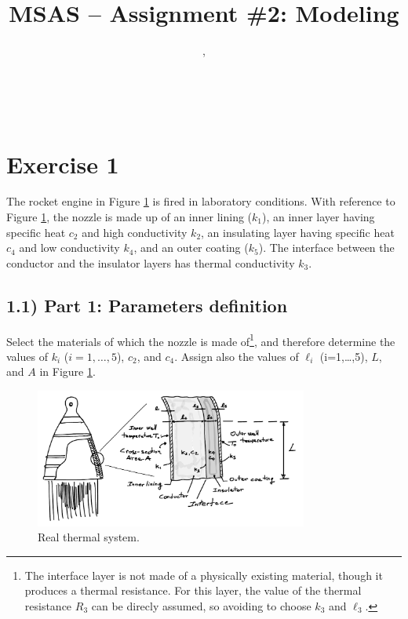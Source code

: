 \documentclass[11pt,a4paper,oneside]{article}
\title{MSAS -- Assignment \#2: Modeling} %
\author{\large \tr{Student Name}, \tr{123456}}
\date{}
\makeatletter
\newcommand\headlinecolor{\normalcolor}
\renewcommand*\maketitle{%
    \begingroup
    \centering
    \fontsize{15}{15}%
    \selectfont
    \headlinecolor
    \@title\\
    \vspace{5mm}
    \@author
    \par
    \vskip1in
    \endgroup
    \vspace{-22mm}
}
\makeatother
\begin{document}
\maketitle

\thispagestyle{fancy}


\section*{Exercise 1}
The rocket engine in Figure \ref{fig:therm} is fired in laboratory conditions. With reference to Figure \ref{fig:therm}, the nozzle is made up of an inner lining ($k_1$), an inner layer having specific heat $c_2$ and high conductivity $k_2$, an insulating layer having specific heat $c_4$ and low conductivity $k_4$, and an outer coating ($k_5$). The interface between the conductor and the insulator layers has thermal conductivity $k_3$.

\subsection*{1.1) Part 1: Parameters definition}
Select the materials of which the nozzle is made of\footnote{The interface layer is not made of a physically existing material, though it produces a thermal resistance. For this layer, the value of the thermal resistance $R_3$ can be direcly assumed, so avoiding to choose $k_3$ and $\ell_3$.}, and therefore determine the values of $k_i$ ($i=1,\dots,5$), $c_2$, and $c_4$. Assign also the values of $\ell_i$ (i=1,\dots,5), $L$, and $A$ in Figure \ref{fig:therm}.
\begin{figure}[h!]
\centering
\includegraphics[width=0.8\textwidth]{gfx/fig_therm.pdf}
\caption{\label{fig:therm} Real thermal system.}
\end{figure}
\end{document}
